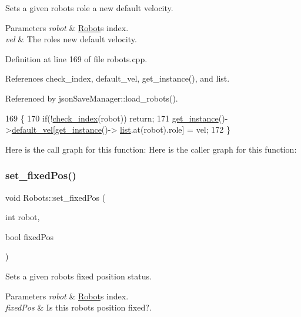 Sets a given robot\textquotesingle{}s role a new default velocity. 
\begin{DoxyParams}{Parameters}
{\em robot} & \hyperlink{struct_robots_1_1_robot}{Robot}\textquotesingle{}s index. \\
\hline
{\em vel} & The role\textquotesingle{}s new default velocity. \\
\hline
\end{DoxyParams}


Definition at line 169 of file robots.\+cpp.



References check\+\_\+index, default\+\_\+vel, get\+\_\+instance(), and list.



Referenced by json\+Save\+Manager\+::load\+\_\+robots().


\begin{DoxyCode}
169                                                       \{
170     \textcolor{keywordflow}{if}(!\hyperlink{robots_8hpp_ae3e6ae8f87cdc750c0b99bc609d9ae43}{check\_index}(robot)) \textcolor{keywordflow}{return};
171     \hyperlink{class_robots_a589bce74db5f34af384952d48435168f}{get\_instance}()->\hyperlink{class_robots_a6c03d49137645a67d5c5e39bb953a788}{default\_vel}[\hyperlink{class_robots_a589bce74db5f34af384952d48435168f}{get\_instance}()->
      \hyperlink{class_robots_a2c6b77265028f82a4342ca1ef15ed305}{list}.at(robot).role] = vel;
172 \}
\end{DoxyCode}
Here is the call graph for this function\+:
Here is the caller graph for this function\+:
\mbox{\label{class_robots_a427266e3332ab91bb3a78b5fb61a6c2c}} 
\subsubsection{\texorpdfstring{set\+\_\+fixed\+Pos()}{set\_fixedPos()}}
{\footnotesize\ttfamily void Robots\+::set\+\_\+fixed\+Pos (\begin{DoxyParamCaption}\item[{int}]{robot,  }\item[{bool}]{fixed\+Pos }\end{DoxyParamCaption})\hspace{0.3cm}{\ttfamily [static]}}

Sets a given robot\textquotesingle{}s fixed position status. 
\begin{DoxyParams}{Parameters}
{\em robot} & \hyperlink{struct_robots_1_1_robot}{Robot}\textquotesingle{}s index. \\
\hline
{\em fixed\+Pos} & Is this robot\textquotesingle{}s position fixed?. \\
\hline
\end{DoxyParams}



